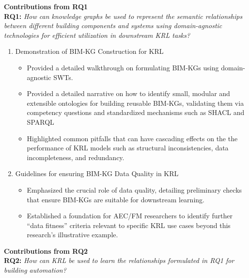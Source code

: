 \noindent \textbf{Contributions from RQ1}\\
\noindent \textbf{RQ1:} \textit{How can knowledge graphs be used to represent the semantic relationships between different building components and systems using domain-agnostic technologies for efficient utilization in downstream KRL tasks?}
\begin{enumerate}
\item 
Demonstration of \ac{BIM-KG} Construction for \ac{KRL}
    \begin{itemize}
    \item 
    Provided a detailed walkthrough on formulating \acp{BIM-KG} using domain-agnostic \acp{SWT}.

    \item 
    Provided a detailed narrative on how to identify small, modular and extensible ontologies for building reusable \acp{BIM-KG}, validating them via competency questions and standardized mechanisms such as \ac{SHACL} and \ac{SPARQL}

    \item 
    Highlighted common pitfalls that can have cascading effects on the the performance of \ac{KRL} models such as structural inconsistencies, data incompleteness, and redundancy.
    \end{itemize}

\item 
Guidelines for ensuring \ac{BIM-KG} Data Quality in \ac{KRL}
    \begin{itemize}
    \item 
    Emphasized the crucial role of data quality, detailing preliminary checks that ensure BIM-KGs are suitable for downstream learning.

    \item 
    Established a foundation for \ac{AEC/FM} researchers to identify further “data fitness” criteria relevant to specific \ac{KRL} use cases beyond this research's illustrative example.
    \end{itemize}  
\end{enumerate}



\noindent \textbf{Contributions from RQ2}\\
\noindent \textbf{RQ2:} \textit{How can KRL be used to learn the relationships formulated in RQ1 for building automation?}

